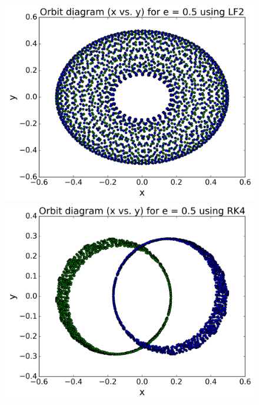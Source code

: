 \begin{figure}[H]
	\centering
	\begin{minipage}[b]{0.48\linewidth}
		\includegraphics[width=\linewidth]{plots_p1/LF2_e05_xy.png}
	\end{minipage}
	\begin{minipage}[b]{0.48\linewidth}
		\includegraphics[width=\linewidth]{plots_p1/RK4_e05_xy.png}
	\end{minipage}
\end{figure}

